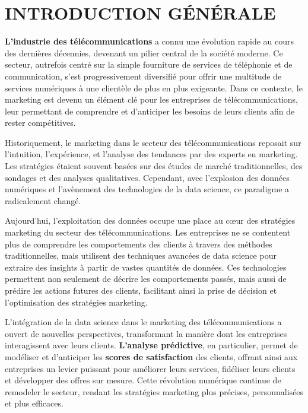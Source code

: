 \chapter*{INTRODUCTION \MakeUppercase{générale}}
\adjustmtc
\thispagestyle{MyStyle}


\justifying

\sloppy {} 

\textbf{L'industrie des télécommunications} a connu une évolution rapide au cours des dernières décennies, devenant un pilier central de la société moderne. Ce secteur, autrefois centré sur la simple fourniture de services de téléphonie et de communication, s'est progressivement diversifié pour offrir une multitude de services numériques à une clientèle de plus en plus exigeante. Dans ce contexte, le marketing est devenu un élément clé pour les entreprises de télécommunications, leur permettant de comprendre et d'anticiper les besoins de leurs clients afin de rester compétitives.\par

Historiquement, le marketing dans le secteur des télécommunications reposait sur l'intuition, l'expérience, et l'analyse des tendances par des experts en marketing. Les stratégies étaient souvent basées sur des études de marché traditionnelles, des sondages et des analyses qualitatives. Cependant, avec l'explosion des données numériques et l'avènement des technologies de la data science, ce paradigme a radicalement changé.\par

Aujourd'hui, l'exploitation des données occupe une place au cœur des stratégies marketing du secteur des télécommunications. Les entreprises ne se contentent plus de comprendre les comportements des clients à travers des méthodes traditionnelles, mais utilisent des techniques avancées de data science pour extraire des insights à partir de vastes quantités de données. Ces technologies permettent non seulement de décrire les comportements passés, mais aussi de prédire les actions futures des clients, facilitant ainsi la prise de décision et l'optimisation des stratégies marketing.

L'intégration de la data science dans le marketing des télécommunications a ouvert de nouvelles perspectives, transformant la manière dont les entreprises interagissent avec leurs clients. \textbf{L'analyse prédictive}, en particulier, permet de modéliser et d'anticiper les \textbf{scores de satisfaction} des clients, offrant ainsi aux entreprises un levier puissant pour améliorer leurs services, fidéliser leurs clients et développer des offres sur mesure. Cette révolution numérique continue de remodeler le secteur, rendant les stratégies marketing plus précises, personnalisées et plus efficaces.\par

